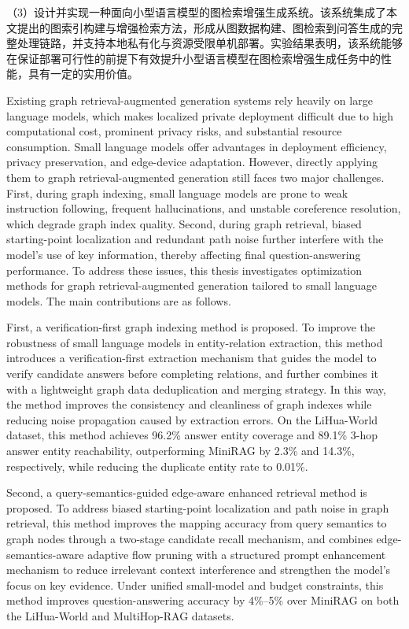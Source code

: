 \documentclass[promaster, vlined]{DissertUESTC}
\begin{document}
（3）设计并实现一种面向小型语言模型的图检索增强生成系统。该系统集成了本文提出的图索引构建与增强检索方法，形成从图数据构建、图检索到问答生成的完整处理链路，并支持本地私有化与资源受限单机部署。实验结果表明，该系统能够在保证部署可行性的前提下有效提升小型语言模型在图检索增强生成任务中的性能，具有一定的实用价值。


\enabstract
Existing graph retrieval-augmented generation systems rely heavily on large language models, which makes localized private deployment difficult due to high computational cost, prominent privacy risks, and substantial resource consumption. Small language models offer advantages in deployment efficiency, privacy preservation, and edge-device adaptation. However, directly applying them to graph retrieval-augmented generation still faces two major challenges. First, during graph indexing, small language models are prone to weak instruction following, frequent hallucinations, and unstable coreference resolution, which degrade graph index quality. Second, during graph retrieval, biased starting-point localization and redundant path noise further interfere with the model's use of key information, thereby affecting final question-answering performance. To address these issues, this thesis investigates optimization methods for graph retrieval-augmented generation tailored to small language models. The main contributions are as follows.

First, a verification-first graph indexing method is proposed. To improve the robustness of small language models in entity-relation extraction, this method introduces a verification-first extraction mechanism that guides the model to verify candidate answers before completing relations, and further combines it with a lightweight graph data deduplication and merging strategy. In this way, the method improves the consistency and cleanliness of graph indexes while reducing noise propagation caused by extraction errors. On the LiHua-World dataset, this method achieves 96.2\% answer entity coverage and 89.1\% 3-hop answer entity reachability, outperforming MiniRAG by 2.3\% and 14.3\%, respectively, while reducing the duplicate entity rate to 0.01\%.

Second, a query-semantics-guided edge-aware enhanced retrieval method is proposed. To address biased starting-point localization and path noise in graph retrieval, this method improves the mapping accuracy from query semantics to graph nodes through a two-stage candidate recall mechanism, and combines edge-semantics-aware adaptive flow pruning with a structured prompt enhancement mechanism to reduce irrelevant context interference and strengthen the model's focus on key evidence. Under unified small-model and budget constraints, this method improves question-answering accuracy by 4\%--5\% over MiniRAG on both the LiHua-World and MultiHop-RAG datasets.
\end{document}
